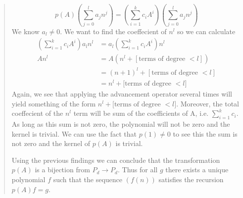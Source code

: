 \documentclass[letter]{article}
\begin{document}
\begin{enumerate}
\begin{quote}
		\[
		    p(A)(\sum_{j=0}^l a_j n^j) = (\sum_{i=1}^{k} c_iA^i) (\sum_{j=0}^l a_j n^j)
		\]
		We know $a_l \neq 0$. We want to find the coeffecient of $n^l$ so we can calculate 
		\begin{align*}
		    (\sum_{i=1}^{k} c_iA^i) a_l n^l &=  a_l(\sum_{i=1}^{k} c_iA^i)n^l \\
		    An^l  
		    &= A(n^l + [\text{terms of degree $<l$}] ) \\
		    &=(n+1)^l +  [\text{terms of degree $<l$}]\\
		    &= n^l + [\text{terms of degree $<l$]}
		\end{align*}
        Again, we see that applying the advancement operator several times will yield something of the form $n^l + [\text{terms of degree $<l$]}$. Moreover, the total coeffecient of the $n^l$ term will be sum of the coefficients of A, i.e. $\sum_{i=1}^{k} c_i$. As long as this sum is not zero, the polynomial will not be zero and the kernel is trivial. We can use the fact that $p(1) \neq 0$ to see this the sum is not zero and the kernel of $p(A)$ is trivial.
        
	    Using the previous findings we can conclude that the transformation $p(A)$ is a bijection from $P_d \to P_d$. Thus for all $g$ there exists a unique polynomial $f$ such that the sequence $(f(n))$ satisfies the recursion $p(A)f = g$.
		
		\end{quote}
		

\end{enumerate}
\end{document}
